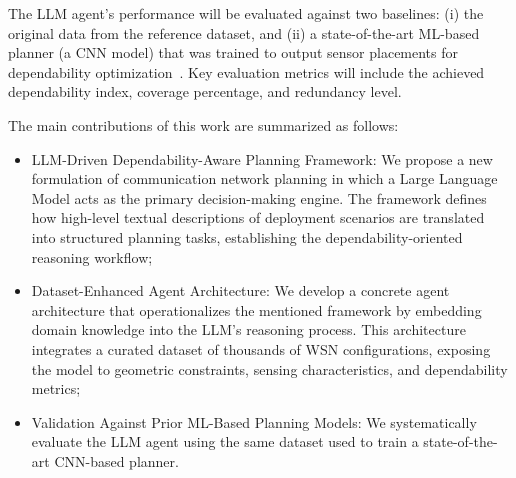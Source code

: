 The LLM agent's performance will be evaluated against two baselines: (i) the original data from the reference dataset, and (ii) a state-of-the-art ML-based planner (a CNN model) that was trained to output sensor placements for dependability optimization~\cite{DepML2025}. Key evaluation metrics will include the achieved dependability index, coverage percentage, and redundancy level. 

The main contributions of this work are summarized as follows:
\begin{itemize}

    \item LLM-Driven Dependability-Aware Planning Framework: We propose a new formulation of communication network planning in which a Large Language Model acts as the primary decision-making engine. The framework defines how high-level textual descriptions of deployment scenarios are translated into structured planning tasks, establishing the dependability-oriented reasoning workflow; %
    
    \item Dataset-Enhanced Agent Architecture: We develop a concrete agent architecture that operationalizes the mentioned framework by embedding domain knowledge into the LLM's reasoning process. This architecture integrates a curated dataset of thousands of WSN configurations, exposing the model to geometric constraints, sensing characteristics, and dependability metrics; %

    \item Validation Against Prior ML-Based Planning Models: We systematically evaluate the LLM agent using the same dataset used to train a state-of-the-art CNN-based planner. %
    
\end{itemize}

